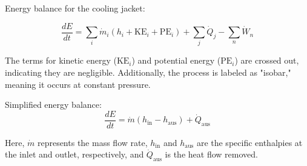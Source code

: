 Energy balance for the cooling jacket:  

\[
\frac{dE}{dt} = \sum_i \dot{m}_i \left( h_i + \text{KE}_i + \text{PE}_i \right) + \sum_j \dot{Q}_j - \sum_n \dot{W}_n
\]

The terms for kinetic energy (\( \text{KE}_i \)) and potential energy (\( \text{PE}_i \)) are crossed out, indicating they are negligible. Additionally, the process is labeled as "isobar," meaning it occurs at constant pressure.  

Simplified energy balance:  
\[
\frac{dE}{dt} = \dot{m} \left( h_{\text{in}} - h_{\text{aus}} \right) + \dot{Q}_{\text{aus}}
\]  

Here, \( \dot{m} \) represents the mass flow rate, \( h_{\text{in}} \) and \( h_{\text{aus}} \) are the specific enthalpies at the inlet and outlet, respectively, and \( \dot{Q}_{\text{aus}} \) is the heat flow removed.